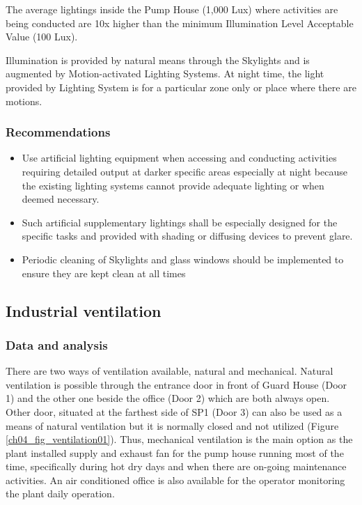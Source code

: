 The average lightings inside the Pump House (1,000 Lux) where activities are being conducted are 10x higher than the minimum Illumination Level Acceptable Value (100 Lux).

Illumination is provided by natural means through the Skylights and is augmented by Motion-activated Lighting Systems. At night time, the light provided by Lighting System is for a particular zone only or place where there are motions.

\subsubsection{Recommendations}

\begin{itemize}
	\item	Use artificial lighting equipment when accessing and conducting activities requiring detailed output at darker specific areas especially at night because the existing lighting systems cannot provide adequate lighting or when deemed necessary.
	\item	Such artificial supplementary lightings shall be especially designed for the specific tasks and provided with shading or diffusing devices to prevent glare.
	\item	Periodic cleaning of Skylights and glass windows should be implemented to ensure they are kept clean at all times
	
\end{itemize}


\subsection{Industrial ventilation}\label{aq04}
\subsubsection{Data and analysis}

There are two ways of ventilation available, natural and mechanical. Natural ventilation is possible through the entrance door in front of Guard House (Door 1) and the other one beside the office (Door 2) which are both always open. Other door, situated at the farthest side of SP1 (Door 3) can also be used as a means of natural ventilation but it is normally closed and not utilized (Figure \ref{ch04_fig_ventilation01}). Thus, mechanical ventilation is the main option as the plant installed supply and exhaust fan for the pump house running most of the time, specifically during hot dry days and when there are on-going maintenance activities. An air conditioned office is also available for the operator monitoring the plant daily operation.

